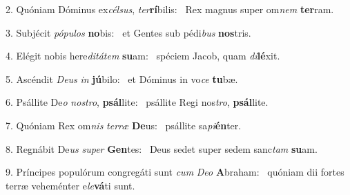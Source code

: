 2. Quóniam Dóminus ex\textit{cél}\textit{sus}, \textit{ter}\textbf{rí}bilis: \ast\  Rex magnus super om\textit{nem} \textbf{ter}ram.\

3. Subjécit \textit{pó}\textit{pu}\textit{los} \textbf{no}bis: \ast\  et Gentes sub pédi\textit{bus} \textbf{nos}tris.\

4. Elégit nobis here\textit{di}\textit{tá}\textit{tem} \textbf{su}am: \ast\  spéciem Jacob, quam \textit{di}\textbf{lé}xit.\

5. Ascéndit \textit{De}\textit{us} \textit{in} \textbf{jú}bilo: \ast\  et Dóminus in vo\textit{ce} \textbf{tu}bæ.\

6. Psállite De\textit{o} \textit{nos}\textit{tro}, \textbf{psál}lite: \ast\  psállite Regi nos\textit{tro}, \textbf{psál}lite.\

7. Quóniam Rex om\textit{nis} \textit{ter}\textit{ræ} \textbf{De}us: \ast\  psállite sa\textit{pi}\textbf{én}ter.\

8. Regnábit De\textit{us} \textit{su}\textit{per} \textbf{Gen}tes: \ast\  Deus sedet super sedem sanc\textit{tam} \textbf{su}am.\

9. Príncipes populórum congregáti sunt \textit{cum} \textit{De}\textit{o} \textbf{A}braham: \ast\  quóniam dii fortes terræ veheménter e\textit{le}\textbf{vá}ti sunt.\

